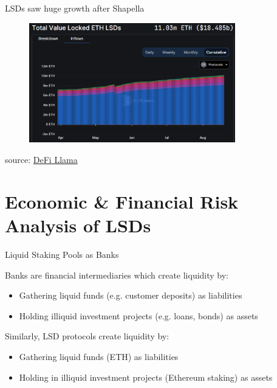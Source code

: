 \documentclass{beamer}
\begin{document}
\begin{frame}{LSDs saw huge growth after Shapella}
    \begin{figure}
        \centering
        \includegraphics[width=0.8\textwidth]{figures/lsd_2023.png}
    \end{figure}
    \tiny{source: \href{https://defillama.com/lsd}{DeFi Llama}}
    
\end{frame}

\section[Economic Analysis]{Economic \& Financial Risk Analysis of LSDs}
\begin{frame}{Liquid Staking Pools as Banks}

    \footnotemark Banks are financial intermediaries which create liquidity by:

    \begin{itemize}
        \item Gathering liquid funds (e.g. customer deposits) as liabilities
        \item Holding illiquid investment projects (e.g. loans, bonds) as assets
    \end{itemize}
    \bigskip
    Similarly, LSD protocols create liquidity by:
    \begin{itemize}
        \item Gathering liquid funds (ETH) as liabilities
        \item Holding in illiquid investment projects (Ethereum staking) as assets
    \end{itemize}


\end{frame}
\end{document}
